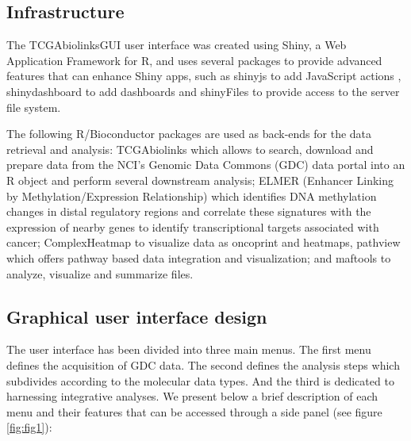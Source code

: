 \subsection{Infrastructure}
The TCGAbiolinksGUI user interface was created using Shiny, a Web Application Framework for R, and uses several packages to provide advanced features that can enhance Shiny apps, such as shinyjs to add JavaScript actions \cite{shinyjs}, shinydashboard to add dashboards \cite{shinydashboard} and shinyFiles \cite{shinyFiles} to provide access to the server file system. 

The following R/Bioconductor packages are used as back-ends for the data retrieval and analysis: TCGAbiolinks \cite{TCGAbiolinks} which allows to search, download and prepare data from the NCI's Genomic Data Commons (GDC) data portal into an R object and perform several downstream analysis;  ELMER (Enhancer Linking by Methylation/Expression Relationship) \cite{yao2015inferring, ELMER2} which identifies DNA methylation changes in distal regulatory regions and correlate these signatures with the expression of nearby genes to identify transcriptional targets associated with cancer; ComplexHeatmap \cite{Gu20052016} to visualize data as oncoprint and heatmaps, pathview \cite{luo2013pathview} which offers pathway based data integration and visualization; and maftools \cite{Maftools} to analyze, visualize and summarize  files.


\subsection{Graphical user interface design}
The user interface has been divided into three main  menus. The first menu defines the acquisition of GDC data. The second defines the analysis steps which subdivides according to the molecular data types.  And the third is dedicated to harnessing integrative analyses. We present below a brief description of each menu and their features that can be accessed through a side panel (see figure \ref{fig:fig1}): 


